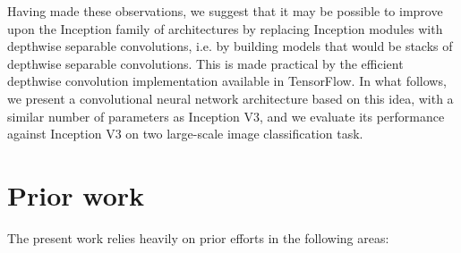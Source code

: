 \documentclass[10pt,twocolumn,letterpaper]{article}
\begin{document}
Having made these observations, we suggest that it may be possible to improve upon the Inception family of architectures by replacing Inception modules with depthwise separable convolutions, i.e. by building models that would be stacks of depthwise separable convolutions. This is made practical by the efficient depthwise convolution implementation available in TensorFlow. In what follows, we present a convolutional neural network architecture based on this idea, with a similar number of parameters as Inception V3, and we evaluate its performance against Inception V3 on two large-scale image classification task.

\section{Prior work}

The present work relies heavily on prior efforts in the following areas:
\end{document}
